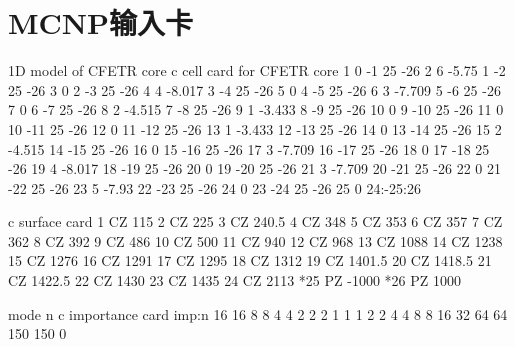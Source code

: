 \chapter{MCNP输入卡}

\begin{python}
1D model of CFETR core                                                          
c cell card for CFETR core                                                     
1 0 -1 25 -26
2 6 -5.75 1 -2 25 -26
3 0 2 -3 25 -26
4 4 -8.017 3 -4 25 -26
5 0 4 -5 25 -26
6 3 -7.709 5 -6 25 -26
7 0 6 -7 25 -26
8 2 -4.515 7 -8 25 -26
9 1 -3.433 8 -9 25 -26
10 0 9 -10 25 -26
11 0 10 -11 25 -26
12 0 11 -12 25 -26
13 1 -3.433 12 -13 25 -26
14 0 13 -14 25 -26
15 2 -4.515 14 -15 25 -26
16 0 15 -16 25 -26
17 3 -7.709 16 -17 25 -26
18 0 17 -18 25 -26
19 4 -8.017 18 -19 25 -26
20 0 19 -20 25 -26
21 3 -7.709 20 -21 25 -26
22 0 21 -22 25 -26
23 5 -7.93 22 -23 25 -26
24 0 23 -24 25 -26
25 0 24:-25:26                                          

c surface card
1 CZ 115
2 CZ 225
3 CZ 240.5
4 CZ 348                                            
5 CZ 353
6 CZ 357
7 CZ 362
8 CZ 392
9 CZ 486
10 CZ 500                                                                    
11 CZ 940                                                                     
12 CZ 968                                                                     
13 CZ 1088                                                                    
14 CZ 1238                                                                    
15 CZ 1276                                                                    
16 CZ 1291                                                                  
17 CZ 1295                                                                 
18 CZ 1312                                                                 
19 CZ 1401.5
20 CZ 1418.5
21 CZ 1422.5                                                               
22 CZ 1430
23 CZ 1435
24 CZ 2113
*25 PZ -1000
*26 PZ 1000

mode n
c importance card
imp:n 16 16 8 8 4 4 2 2 2 1 1 1 2 2 4 4 8 8 16 32 64 64 150 150 0
\end{python}

